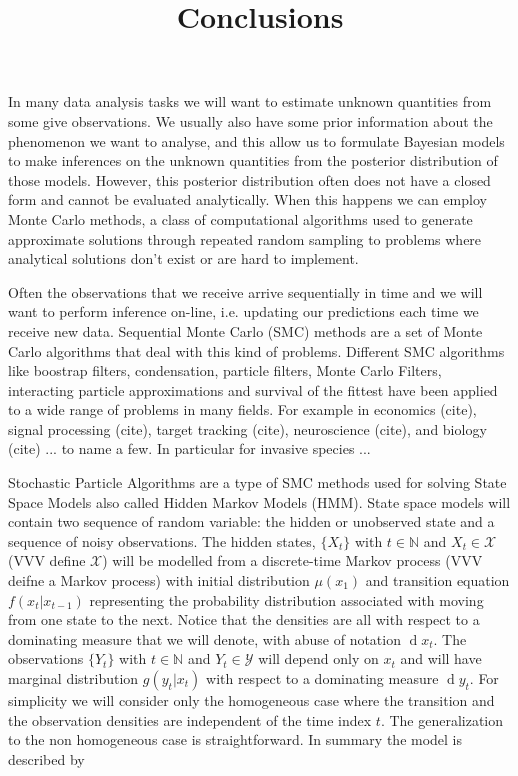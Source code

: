 \documentclass[11pt,a4paper]{article}
\title{Conclusions}
\renewcommand{\d}[1]{\ensuremath{\operatorname{d}\!{#1}}}
\begin{document}
In many data analysis tasks we will want to estimate unknown quantities from some give observations. We usually also have some prior information about the phenomenon we want to analyse, and this allow us to formulate Bayesian models to make inferences on the unknown quantities from the posterior distribution of those models. However, this posterior distribution often does not have a closed form and cannot be evaluated analytically. When this happens we can employ Monte Carlo methods, a class of computational algorithms used to generate approximate solutions through repeated random sampling to problems where analytical solutions don't exist or are hard to implement.

Often the observations that we receive arrive sequentially in time and we will want to perform inference on-line, i.e. updating our predictions each time we receive new data. Sequential Monte Carlo (SMC) methods are a set of Monte Carlo algorithms that deal with this kind of problems. 
Different SMC algorithms like boostrap filters, condensation, particle filters, Monte Carlo Filters, interacting particle approximations and survival of the fittest have been applied to a wide range of problems in many fields. For example in economics (cite), signal processing (cite), target tracking (cite), neuroscience (cite), and biology (cite) ... to name a few. In particular for invasive species ...

Stochastic Particle Algorithms are a type of SMC methods used for solving State Space Models also called Hidden Markov Models (HMM). State space models will contain two sequence of random variable: the hidden or unobserved state and a sequence of noisy observations. The hidden states, $\{ X_t \}$ with $t \in \mathbb{N}$ and $X_t \in \mathcal{X}$ (VVV define $\mathcal{X}$) will be modelled from a discrete-time Markov process (VVV deifne a Markov process) with initial distribution $\mu(x_1)$ and transition equation $f(x_t | x_{t-1})$ representing the probability distribution associated with moving from one state to the next. Notice that the densities are all with respect to a dominating measure that we will denote, with abuse of notation $\d x_t$. The observations $\{ Y_t \}$ with $t \in \mathbb{N}$ and $Y_t \in \mathcal{Y}$ will depend only on $x_t$ and will have marginal distribution $g(y_t | x_t)$ with respect to a dominating measure $\d y_t$. For simplicity we will consider only the homogeneous case where the transition and the observation densities are independent of the time index $t$. The generalization to the non homogeneous case is straightforward. In summary the model is described by
\end{document}
